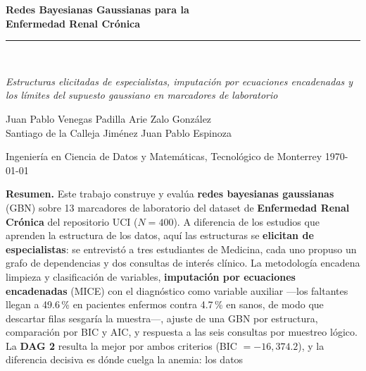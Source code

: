 \documentclass[11pt, a4paper]{article}
\begin{document}
\begin{center}
    \vspace*{0.3cm}
    {\LARGE\bfseries\color{azuloscuro}
        Redes Bayesianas Gaussianas para la\\[0.2em]
        Enfermedad Renal Crónica\par}
    \vspace{0.5em}
    \rule{0.85\textwidth}{1pt}\\[0.4em]
    {\large\itshape Estructuras elicitadas de especialistas, imputación por ecuaciones
    encadenadas y los límites del supuesto gaussiano en marcadores de laboratorio\par}
    \vspace{0.8em}
    {\normalsize
    Juan Pablo Venegas Padilla \quad\textbullet\quad Arie Zalo González\\[0.25em]
    Santiago de la Calleja Jiménez \quad\textbullet\quad Juan Pablo Espinoza\par}
    \vspace{0.3em}
    {\small Ingeniería en Ciencia de Datos y Matemáticas, Tecnológico de Monterrey
    \quad\textbullet\quad \today\par}
    \vspace{0.8em}
    \colorbox{azulclaro}{%
        \parbox{0.92\textwidth}{\small
            \vspace{0.2cm}
            \textbf{Resumen.} Este trabajo construye y evalúa \textbf{redes bayesianas gaussianas}
            (GBN) sobre 13 marcadores de laboratorio del dataset de \textbf{Enfermedad Renal
            Crónica} del repositorio UCI ($N=400$). A diferencia de los estudios que aprenden la
            estructura de los datos, aquí las estructuras se \textbf{elicitan de especialistas}:
            se entrevistó a tres estudiantes de Medicina, cada uno propuso un grafo de dependencias
            y dos consultas de interés clínico. La metodología encadena limpieza y clasificación de
            variables, \textbf{imputación por ecuaciones encadenadas} (MICE) con el diagnóstico
            como variable auxiliar —los faltantes llegan a 49.6\,\% en pacientes enfermos contra
            4.7\,\% en sanos, de modo que descartar filas sesgaría la muestra—, ajuste de una GBN
            por estructura, comparación por BIC y AIC, y respuesta a las seis consultas por
            muestreo lógico. La \textbf{DAG 2} resulta la mejor por ambos criterios
            (BIC $=-16{,}374.2$), y la diferencia decisiva es dónde cuelga la anemia: los datos
}}
\end{center}
\end{document}

